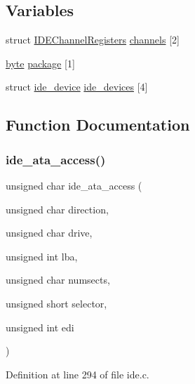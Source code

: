 \subsection*{Variables}
\begin{DoxyCompactItemize}
\item 
struct \hyperlink{a00174}{I\+D\+E\+Channel\+Registers} \hyperlink{a00026_aecefa15f62cf60846ddb1a56f9153143_aecefa15f62cf60846ddb1a56f9153143}{channels} \mbox{[}2\mbox{]}
\item 
\hyperlink{a00116_ab8ef12fab634c171394422d0ee8baf94_ab8ef12fab634c171394422d0ee8baf94}{byte} \hyperlink{a00026_a820b2230ab700e13350794494bd4a60f_a820b2230ab700e13350794494bd4a60f}{package} \mbox{[}1\mbox{]}
\item 
struct \hyperlink{a00178}{ide\+\_\+device} \hyperlink{a00026_ab97a828ed4839b575dc382e2bf826e87_ab97a828ed4839b575dc382e2bf826e87}{ide\+\_\+devices} \mbox{[}4\mbox{]}
\end{DoxyCompactItemize}


\subsection{Function Documentation}
\mbox{\label{a00026_a4da0883393a98b937fdc3015a0a3f265_a4da0883393a98b937fdc3015a0a3f265}} 
\subsubsection{\texorpdfstring{ide\+\_\+ata\+\_\+access()}{ide\_ata\_access()}}
{\footnotesize\ttfamily unsigned char ide\+\_\+ata\+\_\+access (\begin{DoxyParamCaption}\item[{unsigned char}]{direction,  }\item[{unsigned char}]{drive,  }\item[{unsigned int}]{lba,  }\item[{unsigned char}]{numsects,  }\item[{unsigned short}]{selector,  }\item[{unsigned int}]{edi }\end{DoxyParamCaption})}



Definition at line 294 of file ide.\+c.


